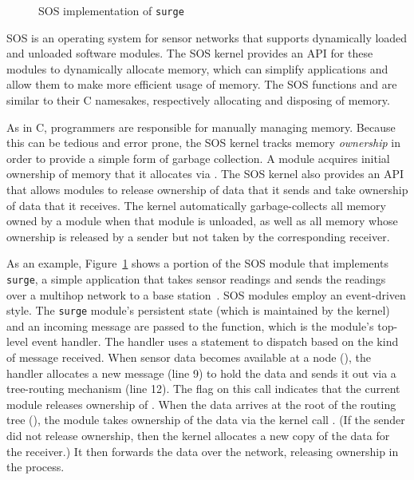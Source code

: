 \begin{figure}[t]

\caption{SOS implementation of {\tt surge}\label{fig:surge}}
\end{figure}

SOS is an operating system for sensor networks that 
supports dynamically loaded and unloaded software modules.
The SOS kernel provides an API for these modules to dynamically
allocate memory, which can simplify applications and allow them to
make more efficient usage of memory.
The SOS functions  and  are similar
to their C namesakes, respectively
allocating and disposing of memory.  

As in C, programmers are responsible for manually managing memory.  
Because this can be tedious and error prone, the
SOS kernel tracks memory {\em ownership} in order to provide a simple
form of garbage collection.  A module acquires initial
ownership of memory that it allocates via .  The SOS
kernel also provides an API that allows modules to release ownership
of data that it sends and take ownership of data that it receives.
The kernel automatically garbage-collects all memory owned by a module when that
module is unloaded, as well as all memory whose ownership is 
released by a sender but not
taken by the corresponding receiver.  

As an example, Figure~\ref{fig:surge} shows a portion of the SOS module that
implements {\tt surge}, a simple application that takes
sensor readings and sends the readings over a multihop network to a
base station~\cite{nesC}.  SOS modules employ an event-driven style.  
The {\tt surge} module's persistent state (which is maintained by the
kernel) and an
incoming message are passed to the  function,
which is the module's top-level event handler.  The handler
uses a  statement to dispatch based on the kind of
message received.  
When sensor data becomes available at a node
(), the handler allocates a new message (line
9) to hold the data and sends it out via a tree-routing mechanism
(line 12).  The  flag on this
 call indicates that the current module releases
ownership of .  When the data arrives at the root of the
routing tree
(), the module takes ownership of the data
via the kernel call .  (If the sender did
not release ownership, then the kernel allocates a new copy of the
data for the receiver.)  It then forwards the
data over the network, releasing ownership in the process.

